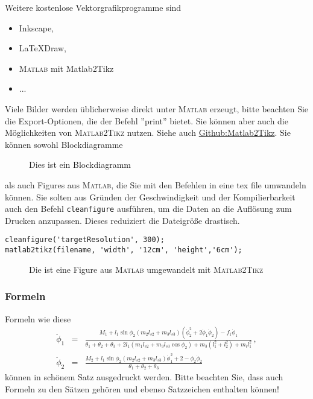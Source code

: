 Weitere kostenlose Vektorgrafikprogramme sind
\begin{itemize}
	\item Inkscape,
	\item \LaTeX Draw,
	\item \textsc{Matlab} mit Matlab2Tikz
	\item ...
\end{itemize}

Viele Bilder werden üblicherweise direkt unter \textsc{Matlab} erzeugt, bitte beachten Sie die
Export-Optionen, die der Befehl ''print'' bietet. Sie können aber auch die Möglichkeiten von \textsc{Matlab2Tikz} nutzen. Siehe auch \href{https://github.com/matlab2tikz/matlab2tikz}{Github:Matlab2Tikz}. Sie können sowohl Blockdiagramme

\begin{figure}[!ht]
    \centering
    \caption{Dies ist ein Blockdiagramm}
    \label{fig:c1_closedloop_L}
\end{figure}

als auch Figures aus \textsc{Matlab}, die Sie mit den Befehlen in eine tex file umwandeln können.
Sie solten aus Gründen der Geschwindigkeit und der Kompilierbarkeit auch den Befehl \texttt{cleanfigure} ausführen, um die Daten an die Auflösung zum Drucken anzupassen. Dieses reduiziert die Dateigröße drastisch.

\begin{lstlisting}
cleanfigure('targetResolution', 300);
matlab2tikz(filename, 'width', '12cm', 'height','6cm');
\end{lstlisting}

\begin{figure}[!ht]
    \centering
    \setlength{\figw}{0.8\textwidth}
    \setlength{\figh}{0.4\textwidth}
    \caption{Die ist eine Figure aus \textsc{Matlab} umgewandelt mit \textsc{Matlab2Tikz}}
    \label{fig:c1_figure2}
\end{figure}


\subsubsection{Formeln}

Formeln wie diese
\begin{eqnarray}
\ddot{\phi}_1
    &=&
    \frac{M_1+l_1 \sin \phi_2
    (m_2 l_{s2} + m_3 l_{s3})
    (\dot{\phi}_2^2+2 \dot{\phi}_1\dot{\phi}_2 )
    -f_1 \dot{\phi}_1}
    {\theta_1+\theta_2+\theta_3+2l_1 (m_1 l_{s2}+m_3 l_{s3} \cos \phi_2)+
    m_3 (l_1^2+l_2^2)+m_l l_1^2}  \,,  \label{e:eqnfirst} \\
\ddot{\phi}_2
    &=&
    \frac{M_2 + l_1 \sin \phi_2 (m_2 l_{s2} + m_3 l_{s3})
    \dot{\phi}_1^2 +2 - \phi_2 \dot{\phi}_2}
    {\theta_1+\theta_2+\theta_3} \, \label{e:eqnsecond}
\end{eqnarray}
können in schönem Satz ausgedruckt werden. Bitte beachten Sie,
dass auch Formeln zu den Sätzen gehören und ebenso Satzzeichen
enthalten können!


